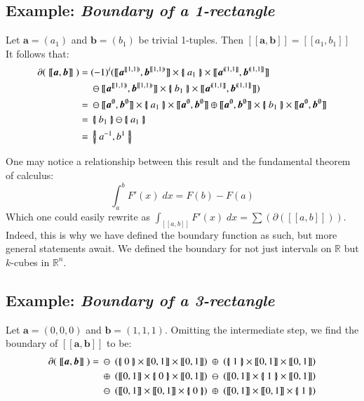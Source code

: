 \subsection{Example: \emph{Boundary of a 1-rectangle}}
Let $\boldsymbol{a}= (a_1)$ and $\boldsymbol{b} = (b_1)$ be trivial 1-tuples. 
Then $[\![\boldsymbol{a}, \boldsymbol{b}]\!] = [\![a_1, b_1]\!]$
It follows that:
\begin{align*}
	\partial ( \; [\![ \boldsymbol{a}, \boldsymbol{b} ]\!] \; )
	=& \; (-1)^i ( [\![\boldsymbol{a}^{[\![1,1)\!)}, \boldsymbol{b}^{[\![1,1)\!)} ]\!]
	\times \hset{a_1} \times
	[\![\boldsymbol{a}^{(\!(1,1]\!]}, \boldsymbol{b}^{(\!(1,1]\!]} ]\!]\\
	&\; \ominus
	[\![\boldsymbol{a}^{[\![1,1)\!)}, \boldsymbol{b}^{[\![1,1)\!)} ]\!]
	\times \hset{b_1} \times
	[\![\boldsymbol{a}^{(\!(1,1]\!]}, \boldsymbol{b}^{(\!(1,1]\!]} ]\!] )\\
	=& \; \ominus [\![\boldsymbol{a}^{\emptyset}, \boldsymbol{b}^{\emptyset} ]\!]
	\times \hset{a_1} \times
	[\![\boldsymbol{a}^{\emptyset}, \boldsymbol{b}^{\emptyset} ]\!]
	\oplus
	[\![\boldsymbol{a}^{\emptyset}, \boldsymbol{b}^{\emptyset} ]\!]
	\times \hset{b_1} \times
	[\![\boldsymbol{a}^{\emptyset}, \boldsymbol{b}^{\emptyset} ]\!] \\
	=& \; \hset{b_1} \ominus \hset{a_1} \\
	=& \; \hset{a^{-1}, b^{1}}
\end{align*}

One may notice a relationship between this result and the fundamental theorem of calculus:
\begin{equation}
	\int_a^b F'(x) \; dx = F(b) - F(a)
\end{equation}
Which one could easily rewrite as $\int_{[\![a,b]\!]} F'(x) \; dx = \sum (\partial([\![a,b]\!]))$.
Indeed, this is why we have defined the boundary function as such, but more general statements await.
We defined the boundary for not just intervals on $\mathbb{R}$ but $k$-cubes in $\mathbb{R}^n$.




\subsection{Example: \emph{Boundary of a 3-rectangle}}
Let $\boldsymbol{a} = (0,0,0)$ and $\boldsymbol{b} = (1,1,1)$.
Omitting the intermediate step, we find the boundary of $[\![ \boldsymbol{a}, \boldsymbol{b} ]\!]$ to be:
\begin{align*}
	\partial ( \; [\![ \boldsymbol{a} , \boldsymbol{b} ]\!] \; ) =
	& 	\; \ominus \; \left( \hset{0} \times [\![0,1]\!] \times [\![0,1]\!] \right)
		\; \oplus \; \left( \hset{1} \times [\![0,1]\!] \times [\![0,1]\!] \right)
	\\& 	\; \oplus \; \left( [\![0,1]\!] \times \hset{0} \times [\![0,1]\!] \right)
	 	\; \ominus \; \left( [\![0,1]\!] \times \hset{1} \times [\![0,1]\!] \right)
	\\& 	\; \ominus \; \left( [\![0,1]\!] \times [\![0,1]\!] \times \hset{0} \right)
	  	\; \oplus \; \left( [\![0,1]\!] \times [\![0,1]\!] \times \hset{1} \right)
\end{align*}

